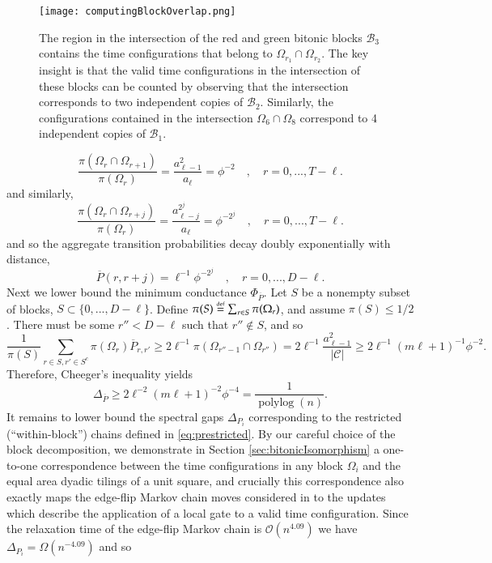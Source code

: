 \documentclass[11pt,letterpaper]{article}
\theoremstyle{definition}
\theoremstyle{remark}
\newcommand{\defeq}{\stackrel{\mbox{\normalfont\tiny def}}=}
\DeclareMathOperator{\polylog}{polylog}
\renewcommand{\leq}{\leqslant}
\renewcommand{\geq}{\geqslant}
\numberwithin{equation}{section}
\theoremstyle{definition}
\begin{document}
\begin{figure}
\begin{center}
\texttt{[image: computingBlockOverlap.png]}
\end{center}
\caption{The region in the intersection of the red and green bitonic blocks $\mathcal{B_3}$ contains the time configurations that belong to $\Omega_{r_1} \cap \Omega_{r_2}$.  The key insight is that the valid time configurations in the intersection of these blocks can be counted by observing that the intersection corresponds to two independent copies of $\mathcal{B_2}$.  Similarly, the configurations contained in the intersection $\Omega_6 \cap \Omega_8$ correspond to 4 independent copies of $\mathcal{B}_1$.}
\label{fig:overlaps}
\end{figure}

\begin{equation}
\frac{\pi(\Omega_r \cap \Omega_{r+1})}{\pi(\Omega_r)} = \frac{a_{\ell - 1}^2}{a_\ell} = \phi^{-2} \quad , \quad r = 0, ... , T - \ell.
\end{equation}
and similarly,
\begin{equation}
\frac{\pi(\Omega_r \cap \Omega_{r+j})}{\pi(\Omega_r)} = \frac{a_{\ell - j}^{2^j}}{a_\ell} =\phi^{-2^j}\quad , \quad r = 0, ... , T - \ell.
\end{equation}
and so the aggregate transition probabilities decay doubly exponentially with distance,
\begin{equation}
\overline{P}(r, r+ j) = \ell^{-1} \phi^{-2^j}\quad , \quad r = 0, ... , D - \ell.
\end{equation}
Next we lower bound the minimum conductance $\Phi_{\overline{P}}$.  Let $S$ be a nonempty subset of blocks, $S \subset \{0,...,D - \ell\}$.  Define $\pi(S) \defeq \sum_{r \in S} \pi(\Omega_r)$, and assume $\pi(S) \leq 1/2$.  There must be some $r'' < D - \ell$ such that $r'' \notin S$, and so
\begin{equation}
\frac{1}{\pi(S)}\sum_{r \in S , r' \in S^c} \pi(\Omega_r) \overline{P}_{r,r'} \geq  2 \ell^{-1} \pi(\Omega_{r''-1} \cap \Omega_{r''}) = 2 \ell^{-1}\frac{a^2_{\ell -1}}{|\mathcal{C}|} \geq  2 \ell^{-1}(m \ell + 1)^{-1} \phi^{-2}.
\end{equation}
Therefore, Cheeger's inequality yields
\begin{equation}
\Delta_{\overline{P}} \geq 2 \ell^{-2} ( m \ell + 1)^{-2} \phi^{-4} = \frac{1}{\polylog(n)}.
\end{equation}
It remains to lower bound the spectral gaps $\Delta_{P_i}$ corresponding to the restricted (``within-block'') chains defined in \eqref{eq:prestricted}.  By our careful choice of the block decomposition, we demonstrate in Section \ref{sec:bitonicIsomorphism} a one-to-one correspondence between the time configurations in any block $\Omega_i$ and the equal area dyadic tilings of a unit square, and crucially this correspondence also exactly maps the edge-flip Markov chain moves considered in \cite{cannon_et_al:LIPIcs:2017:7583} to the updates which describe the application of a local gate to a valid time configuration.  Since the relaxation time of the edge-flip Markov chain is $\mathcal{O}(n^{4.09})$ we have $\Delta_{P_i} = \Omega(n^{-4.09})$  and so
\end{document}
